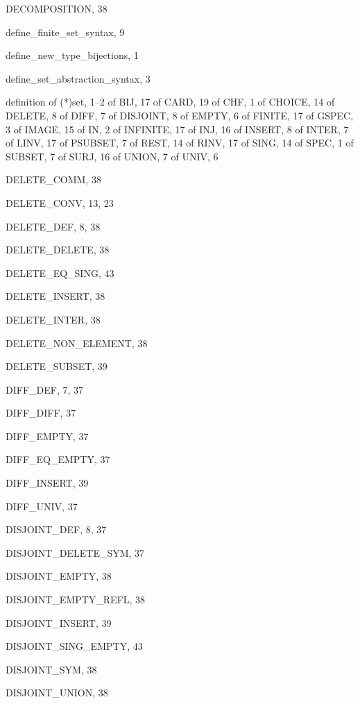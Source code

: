 \begin{theindex}
  \item {\ptt DECOMPOSITION}, 38
  \item {\ptt define\_finite\_set\_syntax}, 9
  \item {\ptt define\_new\_type\_bijections}, 1
  \item {\ptt define\_set\_abstraction\_syntax}, 3
  \item definition
    \subitem of {\ptt (*)set}, 1--2
    \subitem of {\ptt BIJ}, 17
    \subitem of {\ptt CARD}, 19
    \subitem of {\ptt CHF}, 1
    \subitem of {\ptt CHOICE}, 14
    \subitem of {\ptt DELETE}, 8
    \subitem of {\ptt DIFF}, 7
    \subitem of {\ptt DISJOINT}, 8
    \subitem of {\ptt EMPTY}, 6
    \subitem of {\ptt FINITE}, 17
    \subitem of {\ptt GSPEC}, 3
    \subitem of {\ptt IMAGE}, 15
    \subitem of {\ptt IN}, 2
    \subitem of {\ptt INFINITE}, 17
    \subitem of {\ptt INJ}, 16
    \subitem of {\ptt INSERT}, 8
    \subitem of {\ptt INTER}, 7
    \subitem of {\ptt LINV}, 17
    \subitem of {\ptt PSUBSET}, 7
    \subitem of {\ptt REST}, 14
    \subitem of {\ptt RINV}, 17
    \subitem of {\ptt SING}, 14
    \subitem of {\ptt SPEC}, 1
    \subitem of {\ptt SUBSET}, 7
    \subitem of {\ptt SURJ}, 16
    \subitem of {\ptt UNION}, 7
    \subitem of {\ptt UNIV}, 6
  \item {\ptt DELETE\_COMM}, 38
  \item {\ptt DELETE\_CONV}, 13, 23
  \item {\ptt DELETE\_DEF}, 8, 38
  \item {\ptt DELETE\_DELETE}, 38
  \item {\ptt DELETE\_EQ\_SING}, 43
  \item {\ptt DELETE\_INSERT}, 38
  \item {\ptt DELETE\_INTER}, 38
  \item {\ptt DELETE\_NON\_ELEMENT}, 38
  \item {\ptt DELETE\_SUBSET}, 39
  \item {\ptt DIFF\_DEF}, 7, 37
  \item {\ptt DIFF\_DIFF}, 37
  \item {\ptt DIFF\_EMPTY}, 37
  \item {\ptt DIFF\_EQ\_EMPTY}, 37
  \item {\ptt DIFF\_INSERT}, 39
  \item {\ptt DIFF\_UNIV}, 37
  \item {\ptt DISJOINT\_DEF}, 8, 37
  \item {\ptt DISJOINT\_DELETE\_SYM}, 37
  \item {\ptt DISJOINT\_EMPTY}, 38
  \item {\ptt DISJOINT\_EMPTY\_REFL}, 38
  \item {\ptt DISJOINT\_INSERT}, 39
  \item {\ptt DISJOINT\_SING\_EMPTY}, 43
  \item {\ptt DISJOINT\_SYM}, 38
  \item {\ptt DISJOINT\_UNION}, 38


\end{theindex}

